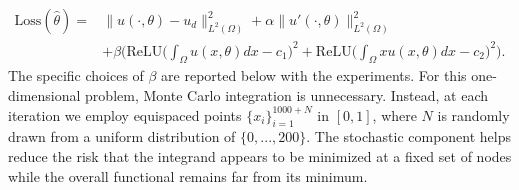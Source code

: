 \documentclass{article}
\numberwithin{equation}{section}
\begin{document}
\begin{equation}
\begin{split}
     \text{Loss}(\hat{\theta})
    =&
    \|u(\cdot,\theta)-u_d\|_{L^2(\Omega)}^2
    +\alpha\|u'(\cdot,\theta)\|_{L^2(\Omega)}^{2} 
    \\
    &+ \beta \bigg(\text{ReLU} \big(\int_\Omega u(x,\theta)dx-c_1\big)^2 + \text{ReLU} \big(\int_\Omega xu(x,\theta)dx-c_2\big)^2 \bigg).
\end{split}
\end{equation}
The specific choices of $\beta$ are reported below with the experiments.
For this one-dimensional problem, Monte Carlo integration is unnecessary. Instead, at each iteration we employ equispaced points $\{x_i\}_{i=1}^{1000+N}$ in $[0,1]$, where $N$ is randomly drawn from a uniform distribution of $\{0,...,200\}$. The stochastic component helps reduce the risk that the integrand appears to be minimized at a fixed set of nodes while the overall functional remains far from its minimum\cite{yu2018deep}. 
\end{document}
